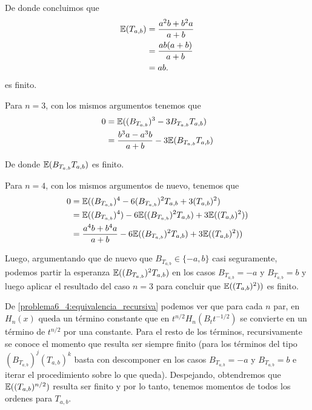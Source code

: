 De donde concluimos que 
\begin{align}
    \mathbb{E}(T_{a,b}) &=  \frac{a^2b +b^2a}{a+b}  \\
                &=  \frac{ab (a+b)}{a+b}    \\
                &=  ab.
\end{align}
es finito.

Para $n=3$, con los mismos argumentos tenemos que
\begin{align}
    0   &=  \mathbb{E}((B_{T_{a,b}})^3 - 3 B_{T_{a,b}}T_{a,b})              \\
        &=  \frac{b^3 a - a^3 b}{a + b} - 3\mathbb{E}(B_{T_{a,b}}T_{a,b})   \\
\end{align}\pn

De donde $\mathbb{E}(B_{T_{a,b}}T_{a,b})$ es finito.

Para $n=4$, con los mismos argumentos de nuevo, tenemos que
\begin{align}
    0   &=  \mathbb{E}((B_{T_{a,b}})^4 - 6(B_{T_{a,b}})^2T_{a,b} + 3 (T_{a,b})^2)                   \\
        &=  \mathbb{E}((B_{T_{a,b}})^4) - 6\mathbb{E}((B_{T_{a,b}})^2T_{a,b}) + 3 \mathbb{E}((T_{a,b})^2))          \\
        &=  \frac{a^4 b + b^4 a}{a+b} - 6\mathbb{E}((B_{T_{a,b}})^2T_{a,b}) + 3 \mathbb{E}((T_{a,b})^2))
\end{align}\pn

Luego, argumentando que de nuevo que $B_{T_{a,b}} \in \{-a, b\}$ casi seguramente, podemos partir la esperanza $\mathbb{E}((B_{T_{a,b}})^2T_{a,b})$
en los casos $B_{T_{a,b}} = -a$ y $B_{T_{a,b}} = b$ y luego aplicar el resultado del caso $n=3$ para concluir que $\mathbb{E}((T_{a,b})^2))$ es finito.\pn

De \eqref{problema6_4:equivalencia_recursiva} podemos ver que para cada $n$ par, en $H_n(x)$ queda un término constante que en $t^{n/2}H_n(B_t t^{-1/2})$
se convierte en un término de $t^{n/2}$ por una constante. Para el resto de los términos, recursivamente se conoce el momento que resulta ser siempre finito 
(para los términos del tipo $(B_{T_{a,b}})^j (T_{a,b})^k$ basta con descomponer en los casos $B_{T_{a,b}} = -a$ y $B_{T_{a,b}} = b$ e iterar el procedimiento
sobre lo que queda). Despejando, obtendremos que $\mathbb{E}((T_{a,b})^{n/2})$ resulta ser finito y por lo tanto, tenemos momentos de todos los ordenes para $T_{a,b}$. 